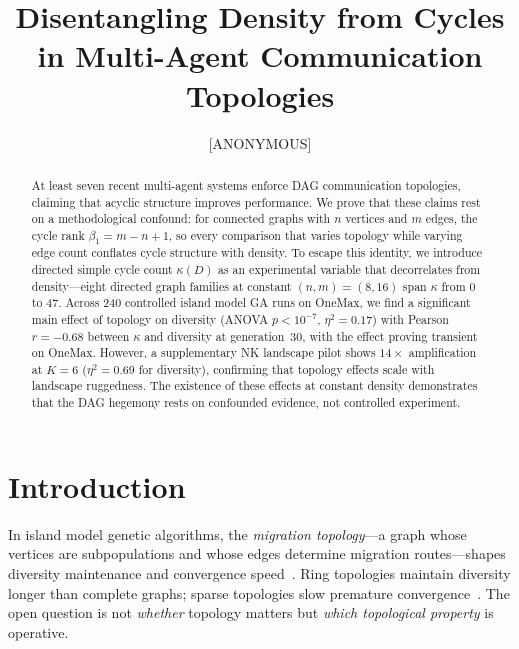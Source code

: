 \documentclass{llncs}
\begin{document}
\title{Disentangling Density from Cycles\\in Multi-Agent Communication Topologies}
\author{[ANONYMOUS]}
\institute{[ANONYMOUS]}
\maketitle

\begin{abstract}
At least seven recent multi-agent systems enforce DAG communication topologies,
claiming that acyclic structure improves performance. We prove that these claims
rest on a methodological confound: for connected graphs with $n$ vertices and $m$
edges, the cycle rank $\beta_1 = m - n + 1$, so every comparison that varies
topology while varying edge count conflates cycle structure with density. To
escape this identity, we introduce directed simple cycle count $\kappa(D)$ as an
experimental variable that decorrelates from density---eight directed graph
families at constant $(n, m) = (8, 16)$ span $\kappa$ from 0 to 47. Across 240
controlled island model GA runs on OneMax, we find a significant main effect of
topology on diversity (ANOVA $p < 10^{-7}$, $\eta^2 = 0.17$) with Pearson
$r = -0.68$ between $\kappa$ and diversity at generation~30, with the effect
proving transient on OneMax. However, a supplementary NK
landscape pilot shows $14\times$ amplification at $K = 6$ ($\eta^2 = 0.69$
for diversity), confirming that topology effects scale with landscape
ruggedness. The existence of these effects at constant density demonstrates
that the DAG hegemony rests on confounded evidence, not controlled experiment.
\end{abstract}

\section{Introduction}
\label{sec:intro}

In island model genetic algorithms, the \emph{migration topology}---a graph
whose vertices are subpopulations and whose edges determine migration
routes---shapes diversity maintenance and convergence
speed~\cite{tomassini2005spatially,alba1999parallel}. Ring topologies maintain
diversity longer than complete graphs; sparse topologies slow premature
convergence~\cite{alba2002parallel,skolicki2005influence}. The open question is
not \emph{whether} topology matters but \emph{which topological property} is
operative.
\end{document}
